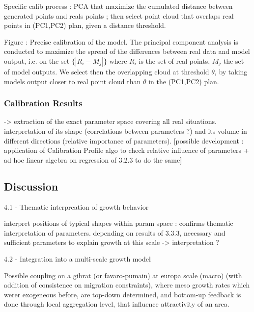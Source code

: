 Specific calib process : PCA that maximize the cumulated distance between generated points and reals points ; then select point cloud that overlaps real points in (PC1,PC2) plan, given a distance threshold.






Figure : Precise calibration of the model. The principal component analysis is conducted to maximize the spread of the differences between real data and model output, i.e. on the set $\{\left|R_i - M_j\right|\}$ where $R_i$ is the set of real points, $M_j$ the set of model outputs. We select then the overlapping cloud at threshold $\theta$, by taking models output closer to real point cloud than $\theta$ in the (PC1,PC2) plan.


\subsubsection{Calibration Results}

-> extraction of the exact parameter space covering all real situations.
interpretation of its shape (correlations between parameters ?) and its volume in different directions (relative importance of parameters).
[possible development : application of Calibration Profile algo to check relative influence of parameters + ad hoc linear algebra on regression of 3.2.3 to do the same]






\subsection{Discussion}


4.1 - Thematic interpreation of growth behavior

interpret positions of typical shapes within param space : confirms thematic interpretation of parameters.
depending on results of 3.3.3, necessary and sufficient parameters to explain growth at this scale -> interpretation ?

4.2 - Integration into a multi-scale growth model

Possible coupling on a gibrat (or favaro-pumain) at europa scale (macro) (with addition of consistence on migration constraints), where meso growth rates which werer exogeneous before, are top-down determined, and bottom-up feedback is done through local aggregation level, that influence attractivity of an area.



